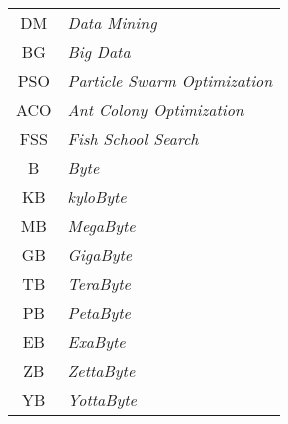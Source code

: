 \vspace*{12pt}

\noindent

\vspace{1em}

\begin{tabular}{c  l}
 DM & \textit{Data Mining}\\
 BG & \textit{Big Data}\\
 PSO & \textit{Particle Swarm Optimization}\\
 ACO & \textit{Ant Colony Optimization}\\
 FSS & \textit{Fish School Search}\\
 B  & \textit{Byte}\\
 KB & \textit{kyloByte}\\
 MB & \textit{MegaByte}\\
 GB & \textit{GigaByte}\\
 TB & \textit{TeraByte}\\
 PB & \textit{PetaByte}\\
 EB & \textit{ExaByte}\\
 ZB & \textit{ZettaByte}\\
 YB & \textit{YottaByte}\\
\end{tabular}





%

